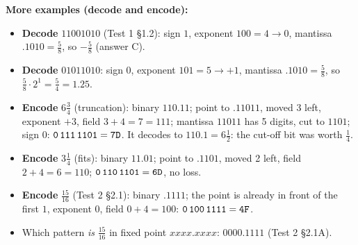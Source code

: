 \documentclass{fkt-notes}
\newcommand{\hx}[1]{\texttt{#1}}
\begin{document}
\medskip\noindent\textbf{More examples (decode and encode):}
\begin{itemize}[nosep]
  \item \textbf{Decode} $11001010$ (Test 1 \S1.2): sign $1$, exponent $100=4\to0$, mantissa
        $.1010=\frac58$, so $-\frac58$ (answer C).
  \item \textbf{Decode} $01011010$: sign $0$, exponent $101=5\to+1$, mantissa
        $.1010=\frac58$, so $\frac58\cdot2^{1}=\frac54=1.25$.
  \item \textbf{Encode} $6\frac34$ (truncation): binary $110.11$; point to $.11011$, moved 3
        left, exponent $+3$, field $3+4=7=111$; mantissa $11011$ has 5 digits, cut to $1101$;
        sign $0$: $\texttt{0\,111\,1101}=\hx{7D}$. It decodes to $110.1=6\frac12$: the cut-off
        bit was worth $\frac14$.
  \item \textbf{Encode} $3\frac14$ (fits): binary $11.01$; point to $.1101$, moved 2 left,
        field $2+4=6=110$; $\texttt{0\,110\,1101}=\hx{6D}$, no loss.
  \item \textbf{Encode} $\frac{15}{16}$ (Test 2 \S2.1): binary $.1111$; the point is already in
        front of the first $1$, exponent $0$, field $0+4=100$: $\texttt{0\,100\,1111}=\hx{4F}$.
  \item Which pattern \emph{is} $\frac{15}{16}$ in fixed point $xxxx.xxxx$: $0000.1111$ (Test 2 \S2.1A).
\end{itemize}
\end{document}
